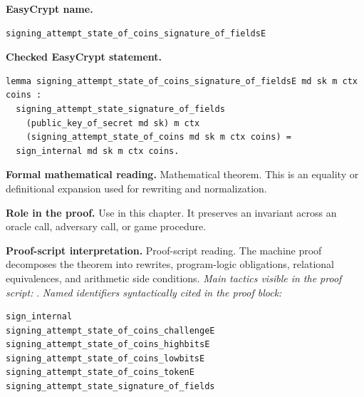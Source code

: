 \begin{formaltheorem}
\noindent\textbf{EasyCrypt name.}
\begin{lstlisting}[language=EasyCrypt,basicstyle=\ttfamily\scriptsize]
signing_attempt_state_of_coins_signature_of_fieldsE
\end{lstlisting}
\noindent\textbf{Checked EasyCrypt statement.}
\begin{lstlisting}[language=EasyCrypt,basicstyle=\ttfamily\scriptsize]
lemma signing_attempt_state_of_coins_signature_of_fieldsE md sk m ctx coins :
  signing_attempt_state_signature_of_fields
    (public_key_of_secret md sk) m ctx
    (signing_attempt_state_of_coins md sk m ctx coins) =
  sign_internal md sk m ctx coins.
\end{lstlisting}
\noindent\textbf{Formal mathematical reading.}
Mathematical theorem. This is an equality or definitional expansion used for rewriting and normalization.

\noindent\textbf{Role in the proof.}
Use in this chapter. It preserves an invariant across an oracle call, adversary call, or game procedure.

\noindent\textbf{Proof-script interpretation.}
Proof-script reading. The machine proof decomposes the theorem into rewrites, program-logic obligations, relational equivalences, and arithmetic side conditions.
\emph{Main tactics visible in the proof script:} .
\emph{Named identifiers syntactically cited in the proof block:}
\begin{lstlisting}[language=EasyCrypt,basicstyle=\ttfamily\scriptsize]
sign_internal
signing_attempt_state_of_coins_challengeE
signing_attempt_state_of_coins_highbitsE
signing_attempt_state_of_coins_lowbitsE
signing_attempt_state_of_coins_tokenE
signing_attempt_state_signature_of_fields
\end{lstlisting}

\end{formaltheorem}

